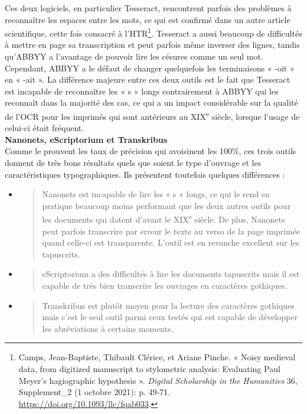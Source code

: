 \documentclass[a4paper,12pt,twoside]{book}
\begin{document}
Ces deux logiciels, en particulier Tesseract, rencontrent parfois des
problèmes à reconnaître les espaces entre les mots, ce qui est confirmé
dans un autre article scientifique, cette fois consacré à
l'HTR\footnote{Camps, Jean-Baptiste, Thibault Clérice, et Ariane Pinche.
	« Noisy medieval data, from digitized manuscript to stylometric
	analysis: Evaluating Paul Meyer's hagiographic hypothesis ».
	\emph{Digital Scholarship in the Humanities} 36, Supplement\_2 (1
	octobre 2021): p. 49‑71.
	\url{https://doi.org/10.1093/llc/fqab033}.}.
Tesseract a aussi beaucoup de difficultés à mettre en page sa
transcription et peut parfois même inverser des lignes, tandis qu'ABBYY
a l'avantage de pouvoir lire les césures comme un seul mot. Cependant,
ABBYY a le défaut de changer quelquefois les terminaisons « -oit » en «
-ait ». La différence majeure entre ces deux outils est le fait que
Tesseract est incapable de reconnaître les « s » longs contrairement à
ABBYY qui les reconnaît dans la majorité des cas, ce qui a un impact
considérable sur la qualité de l'OCR pour les imprimés qui sont
antérieurs au XIX\textsuperscript{e} siècle, lorsque l'usage de celui-ci
était fréquent. \\

\textbf{Nanonets, eScriptorium et Transkribus} \\

Comme le prouvent les taux de précision qui avoisinent les 100\%, ces
trois outils donnent de très bons résultats quels que soient le type
d'ouvrage et les caractéristiques typographiques. Ils présentent
toutefois quelques différences : \\

\begin{itemize}
	\item
	\begin{quote}
		Nanonets est incapable de lire les « s » longs, ce qui le rend en
		pratique beaucoup moins performant que les deux autres outils pour les
		documents qui datent d'avant le XIX\textsuperscript{e} siècle. De
		plus, Nanonets peut parfois transcrire par erreur le texte au verso de
		la page imprimée quand celle-ci est transparente. L'outil est en
		revanche excellent sur les tapuscrits.
	\end{quote}
	\item
	\begin{quote}
		eScriptorium a des difficultés à lire les documents tapuscrits mais il
		est capable de très bien transcrire les ouvrages en caractères
		gothiques.
	\end{quote}
	\item
	\begin{quote}
		Transkribus est plutôt moyen pour la lecture des caractères gothiques
		mais c'est le seul outil parmi ceux testés qui est capable de
		développer les abréviations à certains moments. \\
	\end{quote}
\end{itemize}
\end{document}
